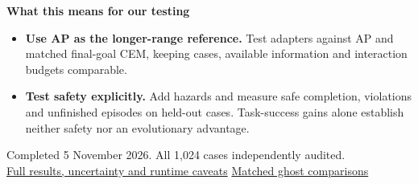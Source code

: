 \documentclass[12pt,a4paper]{article}
\begin{document}
\vspace{4pt}
\textbf{What this means for our testing}

\begin{itemize}
\setlength{\itemsep}{6pt}
\item \textbf{Use AP as the longer-range reference.} Test adapters against
AP and matched final-goal CEM, keeping cases, available information and
interaction budgets comparable.
\item \textbf{Test safety explicitly.} Add hazards and measure safe
completion, violations and unfinished episodes on held-out cases.
Task-success gains alone establish neither safety nor an evolutionary advantage.
\end{itemize}

\vfill
{\footnotesize
Completed 5 November 2026. All 1,024 cases independently audited.\\
\href{https://huggingface.co/datasets/Sachioster/LeWMExp1_AP_Reproduction/blob/main/reports/ap-reproduction-20261105/README.md}{Full results, uncertainty and runtime caveats}
\quad\textbar\quad
\href{https://huggingface.co/datasets/Sachioster/LeWMExp1_AP_Reproduction}{Matched ghost comparisons}
}
\end{document}
